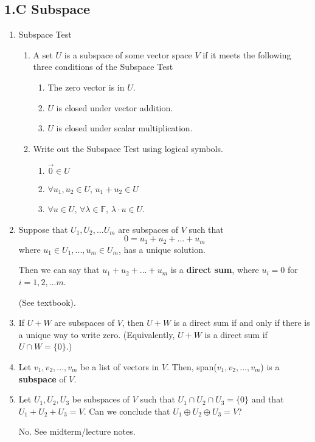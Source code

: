\documentclass[11pt]{article}
\begin{document}
\subsection*{1.C Subspace}
\begin{enumerate}
	\item Subspace Test
	\begin{enumerate}
		\item A set $U$ is a subspace of some vector space $V$ if it meets the following three conditions of the Subspace Test
		\begin{enumerate}
			\item The zero vector is in $U$.
			\item $U$ is closed under vector addition.
			\item $U$ is closed under scalar multiplication.
		\end{enumerate}
		\item Write out the Subspace Test using logical symbols.
		\begin{enumerate}
			\item $\vec{0} \in U$
			\item $\forall u_1, u_2 \in U$, $u_1 + u_2 \in U$
			\item $\forall u \in U$, $\forall \lambda \in \mathbb{F}$, $\lambda \cdot u \in U$.
		\end{enumerate}
	\end{enumerate}	
	\item Suppose that $U_1, U_2, ... U_m$ are subspaces of $V$ such that
	\[0 = u_1 + u_2 + ... + u_m \]
	where $u_1 \in U_1, ..., u_m \in U_m$, has a unique solution.
	
	Then we can say that $u_1 + u_2 + ... + u_m$ is a \textbf{direct sum}, where $u_i = 0$ for $i = 1, 2, ... m$. 
	
	(See textbook).
	
	\item If $U + W$ are subspaces of $V$, then $U + W$ is a direct sum if and only if there is a unique way to write zero. (Equivalently, $U + W$ is a direct sum if $U \cap W = \{0\}$.)
	
	\item Let $v_1, v_2, ..., v_m$ be a list of vectors in $V$. Then, span($v_1, v_2, ..., v_m$) is a \textbf{subspace} of $V$.
	
	\item Let $U_1, U_2, U_3$ be subspaces of $V$ such that $U_1 \cap U_2 \cap U_3 = \{0\}$ and that $U_1 + U_2 + U_3 = V$. Can we conclude that $U_1 \oplus U_2 \oplus U_3 = V$?
	
	\bigskip
	
	No. See midterm/lecture notes.
\end{enumerate}
\end{document}
